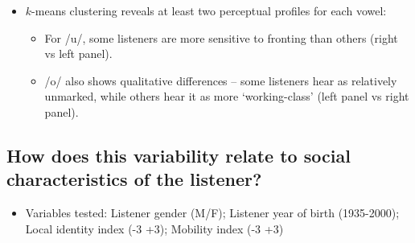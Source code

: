 \documentclass[a0,portrait]{a0poster}
\begin{document}
\begin{multicols}{4}
\begin{itemize}
\item{$k$-means clustering reveals at least two perceptual profiles for each vowel:\begin{itemize}\item{For /u/, some listeners are more sensitive to fronting than others (right vs left panel).}\item{/o/ also shows qualitative differences -- some listeners hear \textipa{[\o:]} as relatively unmarked, while others hear it as more `working-class' (left panel vs right panel).}\end{itemize}}
\end{itemize}
\columnbreak
\subsection*{How does this variability relate to social characteristics of the listener?}
\begin{itemize}
\item{Variables tested: Listener gender (M/F); Listener year of birth (1935-2000); Local identity index (-3 +3); Mobility index (-3 +3)}
\end{itemize}
\vspace*{-1cm}

\end{multicols}
\end{document}

